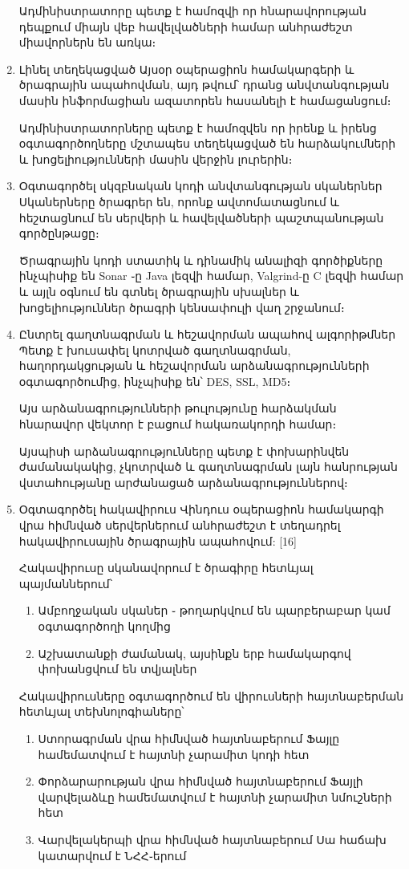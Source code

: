 \documentclass[10pt]{article}
\begin{document}
\begin{sloppypar}
\begin{enumerate}
    Ադմինիստրատորը պետք է համոզվի որ հնարավորության դեպքում միայն
    վեբ հավելվածների համար անհրաժեշտ միավորներն են առկա։
\item Լինել տեղեկացված
    Այսօր օպերացիոն համակարգերի և ծրագրային ապահովման,
    այդ թվում՝ դրանց անվտանգության մասին ինֆորմացիան ազատորեն հասանելի է
    համացանցում։

    Ադմինիստրատորները պետք է համոզվեն որ իրենք և իրենց օգտագործողները
    մշտապես տեղեկացված են հարձակումների և խոցելիությունների մասին
    վերջին լուրերին։
\item Օգտագործել սկզբնական կոդի անվտանգության սկաներներ
    Սկաներները ծրագրեր են, որոնք ավտոմատացնում և հեշտացնում են սերվերի
    և հավելվածների պաշտպանության գործընթացը։

    Ծրագրային կոդի ստատիկ և դինամիկ անալիզի գործիքները ինչպիսիք են
    Sonar ֊ը Java լեզվի համար, Valgrind-ը C լեզվի համար և այլն
    օգնում են գտնել ծրագրային սխալներ և խոցելիություններ ծրագրի
    կենսափուլի վաղ շրջանում։
\item Ընտրել գաղտնագրման և հեշավորման ապահով ալգորիթմներ
    Պետք է խուսափել կոտրված գաղտնագրման, հաղորդակցության և
    հեշավորման արձանագրությունների օգտագործումից, ինչպիսիք են՝
	DES, SSL, MD5։

    Այս արձանագրությունների թուլությունը հարձակման հնարավոր
    վեկտոր է բացում հակառակորդի համար։

    Այսպիսի արձանագրությունները պետք է փոխարինվեն ժամանակակից,
    չկոտրված և գաղտնագրման լայն հանրության վստահությանը արժանացած
    արձանագրություններով։
\item Օգտագործել հակավիրուս
	Վինդուս օպերացիոն համակարգի վրա հիմնված սերվերներում անհրաժեշտ է տեղադրել
	հակավիրուսային ծրագրային ապահովում: [16]

	Հակավիրուսը սկանավորում է ծրագիրը հետևյալ պայմաններում՝
	\begin{enumerate}
		\item Ամբողջական սկաներ ֊ թողարկվում են պարբերաբար կամ օգտագործողի կողմից
		\item Աշխատանքի ժամանակ, այսինքն երբ համակարգով փոխանցվում են տվյալներ
	\end{enumerate}

	Հակավիրուսները օգտագործում են վիրուսների հայտնաբերման հետևյալ տեխնոլոգիաները՝

	\begin{enumerate}
	\item Ստորագրման վրա հիմնված հայտնաբերում
		Ֆայլը համեմատվում է հայտնի չարամիտ կոդի հետ
	\item Փորձարարության վրա հիմնված հայտնաբերում
		Ֆայլի վարվելաձևը համեմատվում է հայտնի չարամիտ
		նմուշների հետ
	\item Վարվելակերպի վրա հիմնված հայտնաբերում
		Սա հաճախ կատարվում է ՆՀՀ֊երում
	\end{enumerate}


\end{enumerate}
\end{sloppypar}
\end{document}

